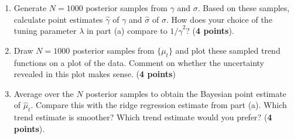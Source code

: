 \documentclass{scrartcl}
\begin{document}
\begin{enumerate}
\begin{enumerate}
   \begin{enumerate}
   \item Generate $N = 1000$ posterior samples from $\gamma$ and
     $\sigma$. Based on these samples, calculate point estimates $\hat{\gamma}$ of
   $\gamma$ and $\hat{\sigma}$ of $\sigma$. How does your choice of the
   tuning parameter $\lambda$ in part (a) compare to
   $1/\hat{\gamma}^2$? (\textbf{4 points}).   
 \item Draw $N = 1000$ posterior samples from  $\{\mu_t\}$ and plot
  these sampled trend functions on a plot of the data. Comment
  on whether the uncertainty revealed in this plot makes
  sense. (\textbf{4 points})
\item Average over the $N$ posterior samples to obtain the Bayesian
  point estimate of $\hat{\mu}_t$. Compare this with the ridge
  regression estimate from part (a). Which trend estimate is smoother?
  Which trend estimate would you prefer? (\textbf{4 points}). 
\end{enumerate}
\end{enumerate}


\end{enumerate}
\end{document}
